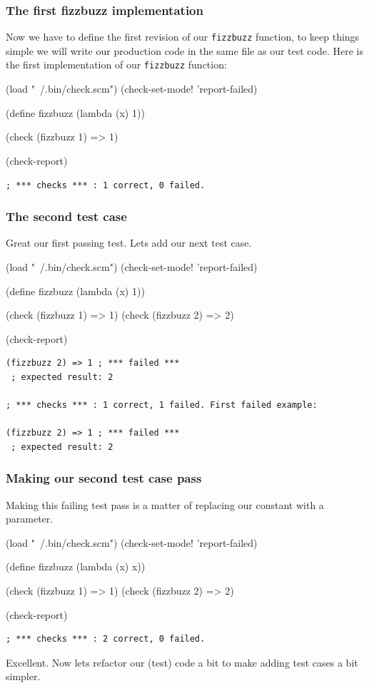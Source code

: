 \documentclass[12pt,a4paper,english,twoside]{article}
\begin{document}
\subsubsection{The first fizzbuzz implementation}
Now we have to define the first revision of our \texttt{fizzbuzz} function, 
to keep things simple we will write our production code in the same file as 
our test code. Here is the first implementation of our \texttt{fizzbuzz} 
function:
\begin{schemecode}
(load "~/.bin/check.scm")
(check-set-mode! 'report-failed)

(define fizzbuzz (lambda (x) 1))

(check (fizzbuzz 1) => 1)

(check-report)
\end{schemecode}
\begin{lstlisting}
; *** checks *** : 1 correct, 0 failed.
\end{lstlisting}
\subsubsection{The second test case}
Great our first passing test. Lets add our next test case.  
\begin{schemecode}
(load "~/.bin/check.scm")
(check-set-mode! 'report-failed)

(define fizzbuzz (lambda (x) 1))

(check (fizzbuzz 1) => 1)
(check (fizzbuzz 2) => 2)

(check-report)
\end{schemecode}
\begin{lstlisting}
(fizzbuzz 2) => 1 ; *** failed ***
 ; expected result: 2

; *** checks *** : 1 correct, 1 failed. First failed example:

(fizzbuzz 2) => 1 ; *** failed ***
 ; expected result: 2
\end{lstlisting}
\subsubsection{Making our second test case pass}
Making this failing test pass is a 
matter of replacing our constant with a parameter.
\begin{schemecode}
(load "~/.bin/check.scm")
(check-set-mode! 'report-failed)

(define fizzbuzz (lambda (x) x))

(check (fizzbuzz 1) => 1)
(check (fizzbuzz 2) => 2)

(check-report)
\end{schemecode}
\begin{lstlisting}
; *** checks *** : 2 correct, 0 failed.  
\end{lstlisting}
Excellent. Now lets refactor our (test) code a bit to make adding test cases 
a bit simpler.
\end{document}
